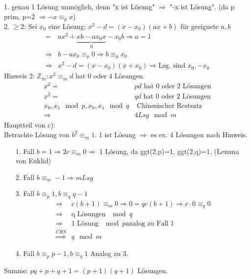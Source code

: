 \documentclass[main.tex]{subfiles}
\begin{document}
\subsubsection{}
1. genau 1 Lösung unmöglich, denn "x ist Lösung" $\Rightarrow$ "-x ist Lösung". (da p prim, p=2 $\Rightarrow -x \equiv_p x$)\\
2.  $\geq 2$: Sei $x_0$ eine Lösung: $x^2-d = (x-x_0)(ax+b)$ für geeignete $a,b$\\
\begin{align*}
= & ax^2+\underbrace{xb-ax_0x}_0 - x_0b \Rightarrow a = 1\\
\Rightarrow & b-ax_0 \equiv_p 0 \Rightarrow b \equiv_p x_0\\
\Rightarrow & x^2-d = (x-x_0)(x+x_0) \Rightarrow \text{Lsg. sind } x_0, -x_0
\end{align*}
Hinweis 2: $\mathbb{Z}_m: x^2 \equiv_m d$ hat 0 oder 4 Lösungen.\\
\begin{align*}
x^2 = & pd \text{ hat 0 oder 2 Lösungen}\\
x^2 = & qd \text{ hat 0 oder 2 Lösungen}\\
x_0,x_1 \mod p, x_0,x_1 \mod q& \text{ Chinesischer Restsatz}\\
\Rightarrow & 4 Lsg \mod m
\end{align*}
Hauptteil von c):\\
Betrachte Lösung von $b^2 \equiv_m 1$. 1 ist Lösung $\Rightarrow$ es ex. 4 Lösungen nach Hinweis.\\
\begin{itemize}
	\item[1. Fall] $b = 1\Rightarrow 2c \equiv_m 0 \Rightarrow$ 1 Lösung, da ggt(2,p)=1, ggt(2,q)=1, (Lemma von Euklid)
	\item[2. Fall] $b\equiv_m -1\Rightarrow m Lsg$
	\item[3. Fall] $b\equiv_p 1, b \equiv_q q-1$ 
	\begin{align*}
	\Rightarrow &c(b+1) \equiv_m 0 \Rightarrow 0 = qc(b+1)\Rightarrow c\cdot 0 \equiv_q 0\\
	\Rightarrow & \text{q Lösungen } \mod q\\
	\Rightarrow & \text{1 Lösung } \mod p \text{analog zu Fall 1}\\
	\overset{CRS}{\Rightarrow} & q \mod m
	\end{align*}
	\item[4. Fall] $b\equiv_p p-1, b \equiv_q 1$ \qquad Analog zu 3.
\end{itemize}
Summe: $pq+p+q+1 = (p+1)(q+1)$ Lösungen.
\end{document}
